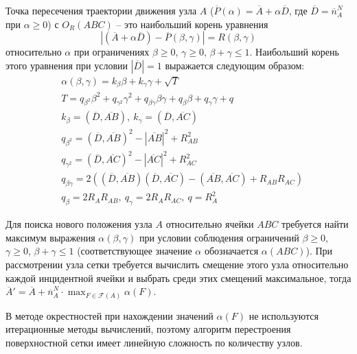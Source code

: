 \documentclass[a4paper,14pt]{extarticle}                     %
\theoremstyle{plain}                                         %
\begin{document}
Точка пересечения траектории движения узла $A$ ($\overline{P}(\alpha) = \overline{A} + \alpha \overline{D}$, где $\overline{D} = \overline{n}_A^N$ при $\alpha \ge 0$) с $O_R(ABC)$ -- это наибольший корень уравнения
\begin{equation*}
|(\overline{A} + \alpha \overline{D}) - \overline{P}(\beta, \gamma)| = R(\beta, \gamma)
\end{equation*}
относительно $\alpha$ при ограничениях $\beta \ge 0$, $\gamma \ge 0$, $\beta + \gamma \le 1$.
Наибольший корень этого уравнения при условии $|\overline{D}| = 1$ выражается следующим образом:
\begin{equation*}
	\begin{aligned}
		& \alpha(\beta, \gamma) = k_{\beta} \beta + k_{\gamma} \gamma + \sqrt{T} \\
		& T = q_{\beta^2} \beta^2 + q_{\gamma^2} \gamma^2 + q_{\beta \gamma} \beta \gamma + q_{\beta} \beta + q_{\gamma} \gamma + q \\
		& k_{\beta} = (\overline{D}, \overline{AB}), \ k_{\gamma} = (\overline{D}, \overline{AC}) \\
		& q_{\beta^2} = (\overline{D}, \overline{AB})^2 - |\overline{AB}|^2 + R_{AB}^2 \\
		& q_{\gamma^2} = (\overline{D}, \overline{AC})^2 - |\overline{AC}|^2 + R_{AC}^2 \\
		& q_{\beta \gamma} = 2 \left( (\overline{D}, \overline{AB}) (\overline{D}, \overline{AC}) - (\overline{AB}, \overline{AC}) + R_{AB}R_{AC} \right) \\
		& q_{\beta} = 2 R_A R_{AB}, \ q_{\gamma} = 2 R_A R_{AC}, \ q = R_A^2
	\end{aligned}
\end{equation*}

Для поиска нового положения узла $A$ относительно ячейки $ABC$ требуется найти максимум выражения $\alpha(\beta, \gamma)$ при условии соблюдения ограничений $\beta \ge 0$, $\gamma \ge 0$, $\beta + \gamma \le 1$ (соответствующее значение $\alpha$ обозначается $\alpha(ABC)$).
При рассмотрении узла сетки требуется вычислить смещение этого узла относительно каждой инцидентной ячейки и выбрать среди этих смещений максимальное, тогда $\overline{A}' = \overline{A} + \overline{n}_A^N \cdot \max_{F \in \mathscr{F}(A)}{\alpha(F)}$.

В методе окрестностей при нахождении значений $\alpha(F)$ не используются итерационные методы вычислений, поэтому алгоритм перестроения поверхностной сетки имеет линейную сложность по количеству узлов.
\end{document}
